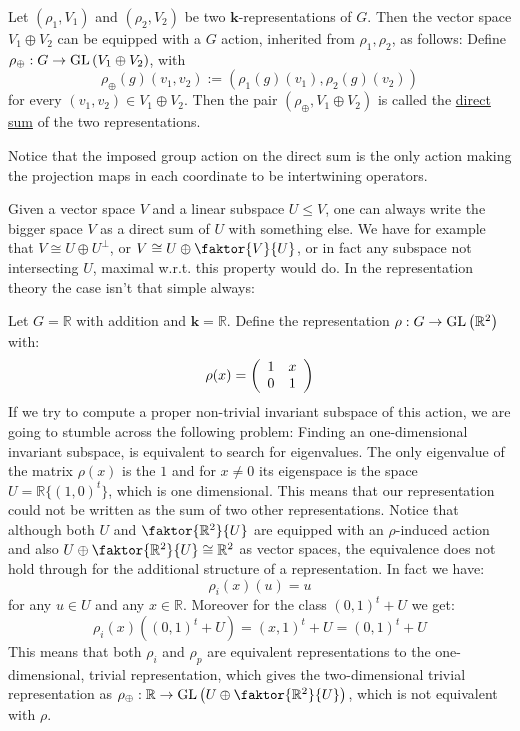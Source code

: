 \begin{definition} Let $(\rho_1,V_1)$ and $(\rho_2,V_2)$ be two $\mathbf{k}$-representations of $G$. Then the vector space $V_1\oplus V_2$ can be equipped with a $G$ action, inherited from $\rho_1,\rho_2$, as follows: Define $\rho_{\oplus}:G\to\GL{V_1\oplus V_2}$, with
$$\rho_{\oplus}(g)(v_1,v_2):=(\rho_1(g)(v_1),\rho_2(g)(v_2))$$
for every $(v_1,v_2)\in V_1\oplus V_2$. Then the pair $(\rho_{\oplus},V_1\oplus V_2)$ is called the \ul{direct sum} of the two representations.
\end{definition}

Notice that the imposed group action on the direct sum is the only action making the projection maps in each coordinate to be intertwining operators.

Given a vector space $V$ and a linear subspace $U\leq V$, one can always write the bigger space $V$ as a direct sum of $U$ with something else. We have for example that $V\cong U\oplus U^{\perp}$, or $V\cong U\oplus\faktor{V}{U}$, or in fact any subspace not intersecting $U$, maximal w.r.t. this property would do. In the representation theory the case isn't that simple always:

\begin{example} Let $G=\mathbb{R}$ with addition and $\mathbf{k}=\mathbb{R}$. Define the representation $\rho:G\to\GL{\mathbb{R}^2}$ with:
$$\rho(x)=\twocols{1}{0}{x}{1}$$
If we try to compute a proper non-trivial invariant subspace of this action, we are going to stumble across the following problem: Finding an one-dimensional invariant subspace, is equivalent to search for eigenvalues. The only eigenvalue of the matrix $\rho(x)$ is the $1$ and for $x\neq0$ its eigenspace is the space $U=\mathbb{R}\{(1,0)^t\}$, which is one dimensional. This means that our representation could not be written as the sum of two other representations. Notice that although both $U$ and $\faktor{\mathbb{R}^2}{U}$ are equipped with an $\rho$-induced action and also $U\oplus\faktor{\mathbb{R}^2}{U}\cong\mathbb{R}^2$ as vector spaces, the equivalence does not hold through for the additional structure of a representation. In fact we have:
$$\rho_i(x)(u)=u$$
for any $u\in U$ and any $x\in\mathbb{R}$. Moreover for the class $(0,1)^t+U$ we get: 
$$\rho_i(x)((0,1)^t+U)=(x,1)^t+U=(0,1)^t+U$$
This means that both $\rho_i$ and $\rho_p$ are equivalent representations to the one-dimensional, trivial representation, which gives the two-dimensional trivial representation as $\rho_{\oplus}:\mathbb{R}\to\GL{U\oplus\faktor{\mathbb{R}^2}{U}}$, which is not equivalent with $\rho$.
\end{example}

